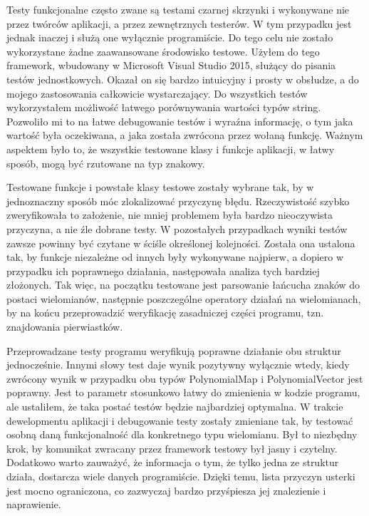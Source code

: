 \documentclass[oneside,a4paper]{book}
\begin{document}
	Testy funkcjonalne często zwane są testami czarnej skrzynki i wykonywane nie przez twórców aplikacji, a przez zewnętrznych testerów. W tym przypadku jest jednak inaczej i służą one wyłącznie programiście. Do tego celu nie zostało wykorzystane żadne zaawansowane środowisko testowe. Użyłem do tego framework, wbudowany w Microsoft Visual Studio 2015, służący do pisania testów jednostkowych. Okazał on się bardzo intuicyjny i prosty w obsłudze, a do mojego zastosowania całkowicie wystarczający. Do wszystkich testów wykorzystałem możliwość łatwego porównywania wartości typów string. Pozwoliło mi to na łatwe debugowanie testów i wyraźna informację, o tym jaka wartość była oczekiwana, a jaka została zwrócona przez wołaną funkcję. Ważnym aspektem było to, że wszystkie testowane klasy i funkcje aplikacji, w łatwy sposób, mogą być rzutowane na typ znakowy.
	
	Testowane funkcje i powstałe klasy testowe zostały wybrane tak, by w jednoznaczny sposób móc zlokalizować przyczynę błędu. Rzeczywistość szybko zweryfikowała to założenie, nie mniej problemem była bardzo nieoczywista przyczyna, a nie źle dobrane testy. W pozostałych przypadkach wyniki testów zawsze powinny być czytane w ściśle określonej kolejności. Została ona ustalona tak, by funkcje niezależne od innych były wykonywane najpierw, a dopiero w przypadku ich poprawnego działania, następowała analiza tych bardziej złożonych. Tak więc, na początku testowane jest parsowanie łańcucha znaków do postaci wielomianów, następnie poszczególne operatory działań na wielomianach, by na końcu przeprowadzić weryfikację zasadniczej części programu, tzn. znajdowania pierwiastków.
	
	Przeprowadzane testy programu weryfikują poprawne działanie obu struktur jednocześnie. Innymi słowy test daje wynik pozytywny wyłącznie wtedy, kiedy zwrócony wynik w przypadku obu typów PolynomialMap i PolynomialVector jest poprawny. Jest to parametr stosunkowo łatwy do zmienienia w kodzie programu, ale ustaliłem, że taka postać testów będzie najbardziej optymalna. W trakcie dewelopmentu aplikacji i debugowanie testy zostały zmieniane tak, by testować osobną daną funkcjonalność dla konkretnego typu wielomianu. Był to niezbędny krok, by komunikat zwracany przez framework testowy był jasny i czytelny. Dodatkowo warto zauważyć, że informacja o tym, że tylko jedna ze struktur działa, dostarcza wiele danych programiście. Dzięki temu, lista przyczyn usterki jest mocno ograniczona, co zazwyczaj bardzo przyśpiesza jej znalezienie i naprawienie.
	
\end{document}

